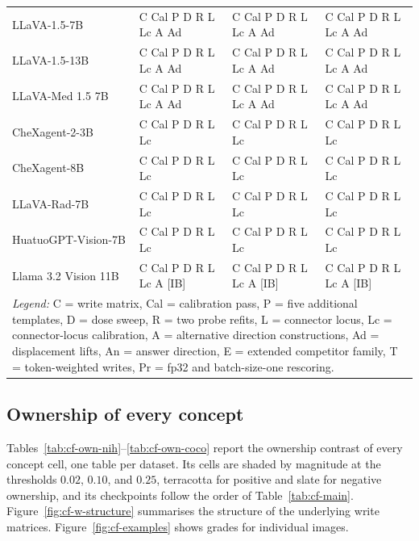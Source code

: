 \documentclass{article}
\begin{document}
\begin{table}[htbp]
{\begin{tabular}{llll}
LLaVA-1.5-7B & C Cal P D R L Lc A Ad & C Cal P D R L Lc A Ad & C Cal P D R L Lc A Ad \\
LLaVA-1.5-13B & C Cal P D R L Lc A Ad & C Cal P D R L Lc A Ad & C Cal P D R L Lc A Ad \\
LLaVA-Med 1.5 7B & C Cal P D R L Lc A Ad & C Cal P D R L Lc A Ad & C Cal P D R L Lc A Ad \\
CheXagent-2-3B & C Cal P D R L Lc & C Cal P D R L Lc & C Cal P D R L Lc \\
CheXagent-8B & C Cal P D R L Lc & C Cal P D R L Lc & C Cal P D R L Lc \\
LLaVA-Rad-7B & C Cal P D R L Lc & C Cal P D R L Lc & C Cal P D R L Lc \\
HuatuoGPT-Vision-7B & C Cal P D R L Lc & C Cal P D R L Lc & C Cal P D R L Lc \\
Llama 3.2 Vision 11B & C Cal P D R L Lc A [IB] & C Cal P D R L Lc A [IB] & C Cal P D R L Lc A [IB] \\
\midrule
\multicolumn{4}{p{1.357\textwidth}}{\textit{Legend:} C = write matrix, Cal = calibration pass, P = five additional templates, D = dose sweep, R = two probe refits, L = connector locus, Lc = connector-locus calibration, A = alternative direction constructions, Ad = displacement lifts, An = answer direction, E = extended competitor family, T = token-weighted writes, Pr = fp32 and batch-size-one rescoring.} \\
\bottomrule
\end{tabular}}
\end{table}

\subsection{Ownership of every concept}
\label{app:cf-tables}

Tables~\ref{tab:cf-own-nih}--\ref{tab:cf-own-coco} report the ownership contrast of every concept cell, one table per dataset. Its cells are shaded by magnitude at the thresholds $0.02$, $0.10$, and $0.25$, terracotta for positive and slate for negative ownership, and its checkpoints follow the order of Table~\ref{tab:cf-main}. Figure~\ref{fig:cf-w-structure} summarises the structure of the underlying write matrices. Figure~\ref{fig:cf-examples} shows grades for individual images.
\end{document}

